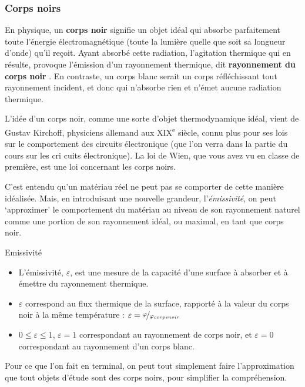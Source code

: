 \documentclass[11pt,a4paper]{article}
\begin{document}
\subsubsection{Corps noirs}

En physique, un \textbf{corps noir} signifie un objet idéal qui absorbe parfaitement toute l'énergie électromagnétique (toute la lumière quelle que soit sa longueur d'onde) qu'il reçoit. Ayant absorbé cette radiation, l'agitation thermique qui en résulte, provoque l'émission d'un rayonnement thermique, dit \textbf{rayonnement du corps noir} . En contraste, un corps blanc serait un corps réfléchissant tout rayonnement incident, et donc qui n'absorbe rien et n'émet aucune radiation thermique. 

L'idée d'un corps noir, comme une sorte d'objet thermodynamique idéal, vient de Gustav Kirchoff, physiciens allemand aux XIX\textsuperscript{e} siècle, connu plus pour ses lois sur le comportement des circuits électronique (que l'on verra dans la partie du cours sur les cri cuits électronique). La loi de Wien, que vous avez vu en classe de première, est une loi concernant les corps noirs. 

C'est entendu qu'un matériau réel ne peut pas se comporter de cette manière idéalisée. Mais, en introduisant une nouvelle grandeur, l'\emph{émissivité}, on peut `approximer' le comportement du matériau au niveau de son rayonnement naturel comme une portion de son rayonnement idéal, ou maximal, en tant que corps noir. 

\begin{defn}{Emissivité}
\begin{itemize}
    \item L'émissivité, $\varepsilon$, est une mesure de la capacité d'une surface à absorber et à émettre du rayonnement thermique. 
    \item $\varepsilon$ correspond au flux thermique de la surface, rapporté à la valeur du corps noir à la même température : $\varepsilon = \nicefrac{\varphi}{\varphi_{corps noir}}$ 
    \item $0 \leq \varepsilon \leq 1$, $\varepsilon=1$ correspondant au rayonnement de corps noir, et $\varepsilon=0$ correspondant au rayonnement d'un corps blanc. 
\end{itemize}
\end{defn}

Pour ce que l'on fait en terminal, on peut tout simplement faire l'approximation que tout objets d'étude sont des corps noirs, pour simplifier la compréhension. 
\end{document}
